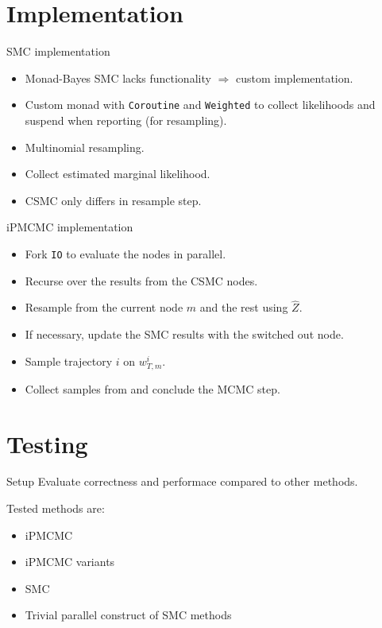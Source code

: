 \documentclass[usenames,dvipsnames,10pt]{beamer}
\begin{document}
\section{Implementation}
\label{sec:implementation}

\begin{frame}[fragile]{SMC implementation}
    
\begin{itemize}
    \item Monad-Bayes SMC lacks functionality $\Rightarrow$ custom implementation.

    \item Custom monad with \texttt{Coroutine} and \texttt{Weighted} to collect likelihoods and suspend when reporting (for resampling).

    \item Multinomial resampling.

    \item Collect estimated marginal likelihood.

    \item CSMC only differs in resample step.

\end{itemize}
\end{frame}

\begin{frame}[fragile]{iPMCMC implementation}
    \begin{itemize}
    \item Fork \texttt{IO} to evaluate the nodes in parallel.
    \item Recurse over the results from the CSMC nodes.
    \item Resample from the current node $m$ and the rest using $\hat Z$.
    \item If necessary, update the SMC results with the switched out node.
    \item Sample trajectory $i$ on $w_{T,m}^i$.
    \item Collect samples from and conclude the MCMC step.
    \end{itemize}
\end{frame}

\section{Testing}
\label{sec:testing}

\begin{frame}[fragile]{Setup}
    Evaluate \alert{correctness} and \alert{performace} compared to other methods.

    Tested methods are:
    \begin{itemize}
        \item iPMCMC
        \item iPMCMC variants
        \item SMC
        \item Trivial parallel construct of SMC methods
    \end{itemize}
\end{frame}
\end{document}
